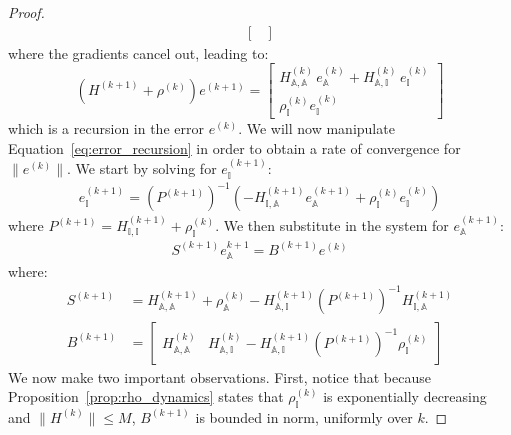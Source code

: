 \documentclass[10pt,a4paper]{amsart}
\begin{document}
\begin{proof}
\begin{equation}
\begin{aligned}
\begin{bmatrix}
\end{bmatrix}
\end{aligned}
\end{equation}
where the gradients cancel out, leading to:
\begin{equation}
\label{eq:error_recursion}
(H^{(k+1)} + \rho^{(k)}) e^{(k+1)} = \begin{bmatrix}
    H^{(k)}_{\mathbb{A},\mathbb{A}}\, e_{\mathbb{A}}^{(k)} + H_{\mathbb{A}, \mathbb{I}}^{(k)} \,e_{\mathbb{I}}^{(k)} \\
    \rho_{\mathbb{I}}^{(k)} e_{\mathbb{I}}^{(k)}
\end{bmatrix}
\end{equation}
which is a recursion in the error $e^{(k)}$. We will now manipulate Equation~\eqref{eq:error_recursion} in order to obtain a rate of convergence for $\|e^{(k)}\|$. We start by solving for $e_{\mathbb{I}}^{(k+1)}$:
\begin{equation}
\label{eq:solve_I}
\begin{aligned}
    e_{\mathbb{I}}^{(k+1)} = \left(P^{(k+1)}\right)^{-1}\left( -H_{\mathbb{I}, \mathbb{A}}^{(k+1)} e_{\mathbb{A}}^{(k+1)} + \rho_{\mathbb{I}}^{(k)} e_{\mathbb{I}}^{(k)} \right)
\end{aligned}
\end{equation}
where $P^{(k+1)} = H_{\mathbb{I}, \mathbb{I}}^{(k+1)} + \rho_{\mathbb{I}}^{(k)}$. We then substitute in the system for $e_{\mathbb{A}}^{(k+1)}$:
\begin{equation}
\begin{aligned}
\label{eq:solve_A}
    S^{(k+1)} e_{\mathbb{A}}^{k+1} = B^{(k+1)} e^{(k)}
\end{aligned}
\end{equation}
where:
\begin{equation}
    \begin{aligned}
        S^{(k+1)} &= H_{\mathbb{A},\mathbb{A}}^{(k+1)} + \rho_{\mathbb{A}}^{(k)} - H^{(k+1)}_{\mathbb{A}, \mathbb{I}} (P^{(k+1)})^{-1} H_{\mathbb{I},\mathbb{A}}^{(k+1)} \\
        B^{(k+1)} &= \begin{bmatrix} H_{\mathbb{A},\mathbb{A}}^{(k)} & H_{\mathbb{A}, \mathbb{I}}^{(k)} - H_{\mathbb{A},\mathbb{I}}^{(k+1)}(P^{(k+1)})^{-1} \rho_{\mathbb{I}}^{(k)} \end{bmatrix}
    \end{aligned}
\end{equation}
We now make two important observations. First, notice that because Proposition~\ref{prop:rho_dynamics} states that $\rho_{\mathbb{I}}^{(k)}$ is exponentially decreasing and $\|H^{(k)}\| \leq M$, $B^{(k+1)}$ is bounded in norm, uniformly over $k$.

\end{proof}
\end{document}

